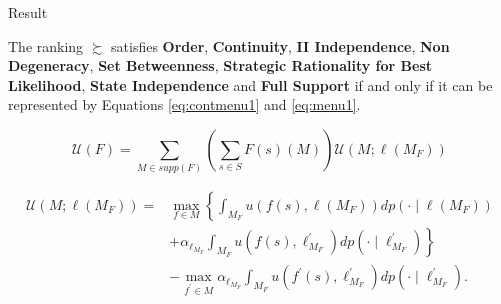 \documentclass[usenames,dvipsnames,aspectratio=169,11pt, envcountsect, handout]{beamer}
\begin{document}
\begin{frame}{Result}

	\begin{brotheorem}
	\end{brotheorem}

	\vspace{-0.5cm}

	The ranking \( \succsim \) satisfies \textbf{Order}, \textbf{Continuity}, \textbf{II Independence}, \textbf{Non Degeneracy}, \textbf{Set Betweenness}, \textbf{Strategic Rationality for Best Likelihood}, \textbf{State Independence} and \textbf{Full Support} if and only if it can be represented by Equations \ref{eq:contmenu1} and \ref{eq:menu1}.

	\begin{equation}
		\mathscr{U}(F)= \sum_{M \in supp \left( F \right)} \left( \sum_{s \in S} F\left( s \right) \left( M \right) \right) \mathcal{U} \left(M ; \ell \left( M_{F} \right) \right) \tag{1}
	\end{equation}

	\begin{equation}
		\begin{aligned}
			\mathcal{U} \left(M ; \ell \left( M_{F} \right) \right) = & \max _{f \in M}\left\{\int_{M_F} u \left( f \left( s \right), \ell \left( M_{F} \right) \right) d p\left(\cdot \mid \ell \left(M_F \right) \right) \right.                \\
			                                                          & \left. +\alpha _{\ell_{M_F}} \int_{M_F} u \left( f \left(s \right) ,  \ell^{\prime}_{M_F} \right) d p\left(\cdot \mid \ell^{\prime}_{M_F} \right)\right\}                 \\
			                                                          & -\max _{f^{\prime} \in M} \alpha _{\ell_{M_F}} \int_{M_F} u\left(f^{\prime}\left(s \right) , \ell^{\prime}_{M_F} \right) d p\left(\cdot \mid \ell^{\prime}_{M_F}\right) .
		\end{aligned} \tag{2}
	\end{equation}

\end{frame}
\end{document}
